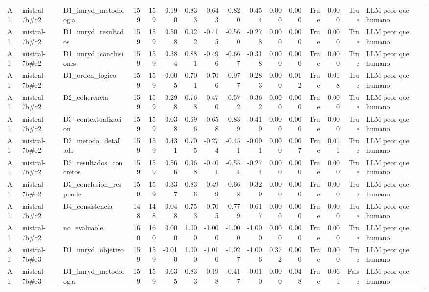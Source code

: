 \begin{table}
{\begin{tabular}{lllrrrrrrrrrrrrl}
A1 & mistral-7b\#r2 & D1\_imryd\_metodologia & 159 & 159 & 0.190 & 0.833 & -0.643 & -0.820 & -0.454 & 0.000 & 0.000 & True & 0.000 & True & LLM peor que humano \\
A1 & mistral-7b\#r2 & D1\_imryd\_resultados & 159 & 159 & 0.508 & 0.922 & -0.415 & -0.560 & -0.278 & 0.000 & 0.000 & True & 0.000 & True & LLM peor que humano \\
A1 & mistral-7b\#r2 & D1\_imryd\_conclusiones & 159 & 159 & 0.384 & 0.881 & -0.496 & -0.667 & -0.318 & 0.000 & 0.000 & True & 0.000 & True & LLM peor que humano \\
A1 & mistral-7b\#r2 & D1\_orden\_logico & 159 & 159 & -0.005 & 0.701 & -0.706 & -0.977 & -0.283 & 0.000 & 0.012 & True & 0.018 & True & LLM peor que humano \\
A1 & mistral-7b\#r2 & D2\_coherencia & 159 & 159 & 0.298 & 0.768 & -0.470 & -0.572 & -0.362 & 0.000 & 0.000 & True & 0.000 & True & LLM peor que humano \\
A1 & mistral-7b\#r2 & D3\_contextualizacion & 159 & 159 & 0.038 & 0.696 & -0.658 & -0.839 & -0.419 & 0.000 & 0.000 & True & 0.000 & True & LLM peor que humano \\
A1 & mistral-7b\#r2 & D3\_metodo\_detallado & 159 & 159 & 0.431 & 0.705 & -0.274 & -0.451 & -0.091 & 0.000 & 0.007 & True & 0.011 & True & LLM peor que humano \\
A1 & mistral-7b\#r2 & D3\_resultados\_concretos & 159 & 159 & 0.566 & 0.968 & -0.401 & -0.554 & -0.274 & 0.000 & 0.000 & True & 0.000 & True & LLM peor que humano \\
A1 & mistral-7b\#r2 & D3\_conclusion\_responde & 159 & 159 & 0.337 & 0.836 & -0.499 & -0.668 & -0.329 & 0.000 & 0.000 & True & 0.000 & True & LLM peor que humano \\
A1 & mistral-7b\#r2 & D4\_consistencia & 148 & 148 & 0.048 & 0.753 & -0.705 & -0.779 & -0.617 & 0.000 & 0.000 & True & 0.000 & True & LLM peor que humano \\
A1 & mistral-7b\#r2 & no\_evaluable & 160 & 160 & 0.000 & 1.000 & -1.000 & -1.000 & -1.000 & 0.000 & 0.000 & True & 0.000 & True & LLM peor que humano \\
A1 & mistral-7b\#r3 & D1\_imryd\_objetivo & 159 & 159 & -0.010 & 1.000 & -1.010 & -1.027 & -1.006 & 0.372 & 0.000 & True & 0.000 & True & LLM peor que humano \\
A1 & mistral-7b\#r3 & D1\_imryd\_metodologia & 159 & 159 & 0.635 & 0.833 & -0.198 & -0.417 & -0.010 & 0.000 & 0.048 & True & 0.061 & False & LLM peor que humano \\

\end{tabular}}
\end{table}
